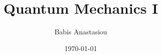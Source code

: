 \documentclass[10pt,oneside]{memoir}
\title{\Huge Quantum Mechanics I}
\author{\LARGE Babis Anastasiou}
\date{\vspace{1em}\today}
\begin{document}
 

\begin{titlingpage}
\end{titlingpage}







\begin{multicols*}{3}
	
\end{multicols*}
\end{document}
